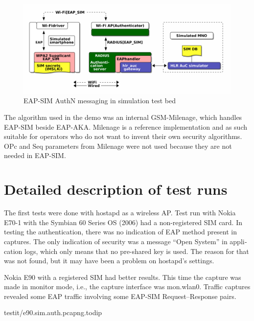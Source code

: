 \documentclass[12pt,a4paper,english]{tutthesis}
\begin{document}
\begin{otherlanguage}{english}
\begin{figure}[htb]
\centering
\includegraphics[width=.9\linewidth]{demoinfra.png}
\caption{\label{eap-sim-testbed}EAP-SIM AuthN messaging in simulation test bed}
\end{figure}





The algorithm used in the demo was an internal GSM-Milenage,
which handles EAP-SIM beside EAP-AKA.
Milenage is a reference implementation and as such suitable for operators who do not 
want to invent their own security algorithms. OPc and Seq parameters from
Milenage were not used because they are not needed in EAP-SIM. 

\section{Detailed description of test runs}
\label{sec-5-2}


The first tests were done with hostapd as a wireless AP.
Test run with Nokia E70-1 with the Symbian 60 Series OS (2006) had a
non-registered SIM card. 
In testing the authentication,
there was no indication of EAP method present in captures. The only
indication of security was a message ``Open System'' in application
logs, which only means that no pre-shared key is used. The reason for
that was not found, but it may have been a problem on hostapd's settings.




Nokia E90 with a registered SIM had better results. 
This time the capture was made in monitor mode, i.e., 
the capture interface was mon.wlan0.
Traffic captures revealed some EAP traffic involving some EAP-SIM
Request--Response pairs.


\renewcommand{\lstlistingname}{Capture}

  {testit/e90.sim.auth.pcapng.todip}


\end{otherlanguage}
\end{document}
